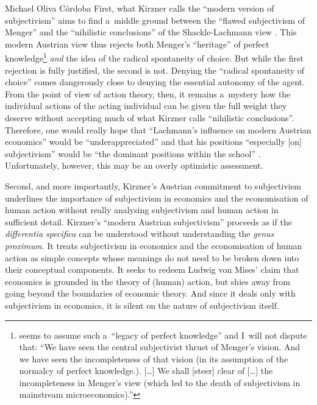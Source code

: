 \begin{artengenv}{Michael Oliva Córdoba}
First, what Kirzner calls the ``modern version of subjectivism'' aims to find a~middle ground between the ``flawed subjectivism of Menger'' and the ``nihilistic conclusions'' of the Shackle-Lachmann view 
\parencites[][pp.14, 19]{meijer_subjectivism_1995}[cf.][]{kirzner_ludwig_1982}. %
 This modern Austrian view thus rejects both Menger's ``heritage'' of perfect knowledge\footnote{
\parencite[][pp.14 \& 16]{meijer_subjectivism_1995} %
 seems to assume such a~``legacy of perfect knowledge'' and I~will not dispute that: ``We have seen the central subjectivist thrust of Menger's vision. And we have seen the incompleteness of that vision (in its assumption of the normalcy of perfect knowledge.). […] We shall [steer] clear of […] the incompleteness in Menger's view (which led to the death of subjectivism in mainstream microeconomics).''} \textit{and} the idea of the radical spontaneity of choice. But while the first rejection is fully justified, the second is not. Denying the ``radical spontaneity of choice'' comes dangerously close to denying the essential autonomy of the agent. From the point of view of action theory, then, it remains a~mystery how the individual actions of the acting individual can be given the full weight they deserve without accepting much of what Kirzner calls ``nihilistic conclusions''. Therefore, one would really hope that ``Lachmann's influence on modern Austrian economics'' would be ``underappreciated'' and that his positions ``especially [on] subjectivism'' would be ``the dominant positions within the school'' 
\parencite[][p.63]{storr_ludwig_2019}. %
 Unfortunately, however, this may be an overly optimistic assessment.



Second, and more importantly, Kirzner's Austrian commitment to subjectivism underlines the importance of subjectivism in economics and the economisation of human action without really analysing subjectivism and human action in sufficient detail. Kirzner's ``modern Austrian subjectivism'' proceeds as if the \textit{differentia specifica} can be understood without understanding the \textit{genus proximum}. It treats subjectivism in economics and the economisation of human action as simple concepts whose meanings do not need to be broken down into their conceptual components. It seeks to redeem Ludwig von Mises' claim that economics is grounded in the theory of (human) action, but shies away from going beyond the boundaries of economic theory. And since it deals only with subjectivism in economics, it is silent on the nature of subjectivism itself.




\end{artengenv}
